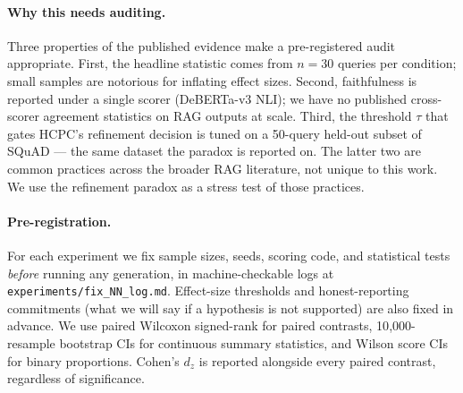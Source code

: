 \paragraph{Why this needs auditing.}
Three properties of the published evidence make a pre-registered
audit appropriate. First, the headline statistic comes from
$n{=}30$ queries per condition; small samples are notorious for
inflating effect sizes. Second, faithfulness is reported under a
single scorer (DeBERTa-v3 NLI); we have no published cross-scorer
agreement statistics on RAG outputs at scale. Third, the threshold
$\tau$ that gates HCPC's refinement decision is tuned on a 50-query
held-out subset of SQuAD --- the same dataset the paradox is
reported on. The latter two are common practices across the broader
RAG literature, not unique to this work. We use the refinement
paradox as a stress test of those practices.

\paragraph{Pre-registration.}
For each experiment we fix sample sizes, seeds, scoring code, and
statistical tests \emph{before} running any generation, in
machine-checkable logs at
\texttt{experiments/fix\_NN\_log.md}. Effect-size thresholds and
honest-reporting commitments (what we will say if a hypothesis is
not supported) are also fixed in advance. We use paired Wilcoxon
signed-rank for paired contrasts, 10{,}000-resample bootstrap CIs
for continuous summary statistics, and Wilson score CIs for binary
proportions. Cohen's $d_z$ is reported alongside every paired
contrast, regardless of significance.
